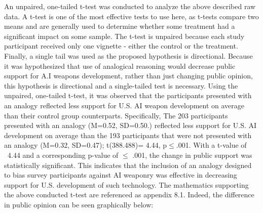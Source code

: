 \documentclass[12pt]{article}
\begin{document}
An unpaired, one-tailed t-test was conducted to analyze the above described raw data. A t-test is one of the most effective tests to use here, as t-tests compare two means and are generally used to determine whether some treatment had a significant impact on some sample. The t-test is unpaired because each study participant received only one vignette - either the control or the treatment. Finally, a single tail was used as the proposed hypothesis is directional. Because it was hypothesized that use of analogical reasoning would decrease public support for A.I weapons development, rather than just changing public opinion, this hypothesis is directional and a single-tailed test is necessary.
\bigbreak
Using the unpaired, one-tailed t-test, it was observed that the participants presented with an analogy reflected less support for U.S. AI weapon development on average than their control group counterparts. Specifically, The 203 participants presented with an analogy (M=0.52, SD=0.50.) reflected less support for U.S. AI development on average than the 193 participants that were not presented with an analogy (M=0.32, SD=0.47); t(388.488)= 4.44, p$\le$.001. With a t-value of ~4.44 and a corresponding p-value of $\le$ .001, the change in public support was statistically significant. This indicates that the inclusion of an analogy designed to bias survey participants against AI weaponry was effective in decreasing support for U.S. development of such technology. The mathematics supporting the above conducted t-test are referenced as appendix 8.1.
\bigbreak
Indeed, the difference in public opinion can be seen graphically below:
\end{document}
